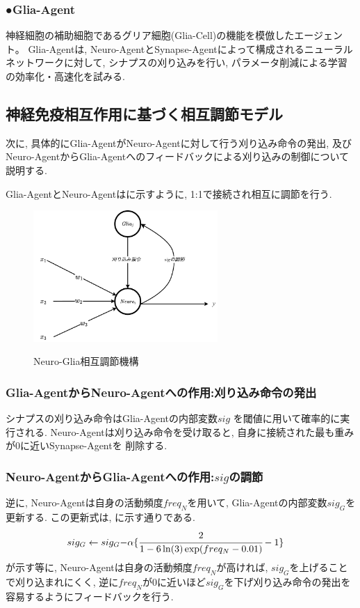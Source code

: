 \documentclass[a4paper,9pt,twocolumn]{jsarticle}
\begin{document}
  \subsubsection*{●Glia-Agent}神経細胞の補助細胞であるグリア細胞(Glia-Cell)の機能を模倣したエージェント。
  Glia-Agentは, Neuro-AgentとSynapse-Agentによって構成されるニューラルネットワークに対して,
  シナプスの刈り込みを行い, パラメータ削減による学習の効率化・高速化を試みる. 

\subsection{神経免疫相互作用に基づく相互調節モデル}
次に, 具体的にGlia-AgentがNeuro-Agentに対して行う刈り込み命令の発出, 及び
Neuro-AgentからGlia-Agentへのフィードバックによる刈り込みの制御について説明する.

Glia-AgentとNeuro-Agentはに示すように, 1:1で接続され相互に調節を行う.
\begin{figure}[H]
  \centering
  \includegraphics[width=7cm]{NeuroGlia.pdf}  
  \label{fig:NeuroGlia}
  \caption{Neuro-Glia相互調節機構}
\end{figure}
\vspace{-2zh}
\subsubsection*{Glia-AgentからNeuro-Agentへの作用:刈り込み命令の発出}
シナプスの刈り込み命令はGlia-Agentの内部変数$sig$
を閾値に用いて確率的に実行される.
Neuro-Agentは刈り込み命令を受け取ると, 自身に接続された最も重みが0に近いSynapse-Agentを
削除する.
\subsubsection*{Neuro-AgentからGlia-Agentへの作用:$sig$の調節}
逆に, Neuro-Agentは自身の活動頻度$freq_N$を用いて, Glia-Agentの内部変数$sig_G$を更新する.
この更新式は, に示す通りである.
\begin{align}
  sig_G\leftarrow sig_G-&\alpha\{\cfrac{2}{1-6\ln(3)\exp(freq_N-0.01)}-1\}
  \label{eq:sig}
\end{align}
が示す等に, Neuro-Agentは自身の活動頻度$freq_N$が高ければ, $sig_G$を上げることで刈り込まれにくく, 
逆に$freq_N$が0に近いほど$sig_G$を下げ刈り込み命令の発出を容易するようにフィードバックを行う.
\end{document}
